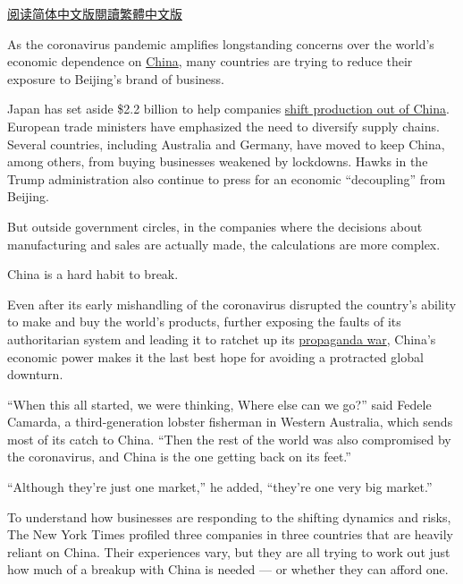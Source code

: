\href{https://cn.nytimes.com/business/20200615/china-decoupling/}{阅读简体中文版}\href{https://cn.nytimes.com/business/20200615/china-decoupling/zh-hant/}{閱讀繁體中文版}

As the coronavirus pandemic amplifies longstanding concerns over the
world's economic dependence on
\href{https://www.nytimes.com/2020/06/17/world/asia/China-DNA-surveillance.html}{China},
many countries are trying to reduce their exposure to Beijing's brand of
business.

Japan has set aside \$2.2 billion to help companies
\href{https://www.bloomberg.com/news/articles/2020-04-08/japan-to-fund-firms-to-shift-production-out-of-china}{shift
production out of China}. European trade ministers have emphasized the
need to diversify supply chains. Several countries, including Australia
and Germany, have moved to keep China, among others, from buying
businesses weakened by lockdowns. Hawks in the Trump administration also
continue to press for an economic ``decoupling'' from Beijing.

But outside government circles, in the companies where the decisions
about manufacturing and sales are actually made, the calculations are
more complex.

China is a hard habit to break.

Even after its early mishandling of the coronavirus disrupted the
country's ability to make and buy the world's products, further exposing
the faults of its authoritarian system and leading it to ratchet up its
\href{https://www.nytimes.com/2020/06/07/world/asia/china-coronavirus.html}{propaganda
war}, China's economic power makes it the last best hope for avoiding a
protracted global downturn.

``When this all started, we were thinking, Where else can we go?'' said
Fedele Camarda, a third-generation lobster fisherman in Western
Australia, which sends most of its catch to China. ``Then the rest of
the world was also compromised by the coronavirus, and China is the one
getting back on its feet.''

``Although they're just one market,'' he added, ``they're one very big
market.''

To understand how businesses are responding to the shifting dynamics and
risks, The New York Times profiled three companies in three countries
that are heavily reliant on China. Their experiences vary, but they are
all trying to work out just how much of a breakup with China is needed
--- or whether they can afford one.

